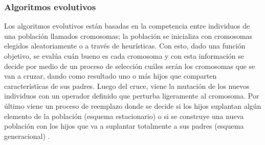 


\subsubsection{Algoritmos evolutivos}

Los algoritmos evolutivos están basadas en la competencia entre individuos de una población llamados cromosomas; la población se inicializa con cromosomas elegidos aleatoriamente o a través de heurísticas. Con esto, dado una función objetivo, se evalúa cuán bueno es cada cromosoma y con esta información se decide por medio de un proceso de selección cuáles serán los cromosomas que se van a cruzar, dando como resultado uno o más hijos que comparten características de sus padres. Luego del cruce, viene la mutación de los nuevos individuos con un operador definido que perturba ligeramente al cromosoma. Por último viene un proceso de reemplazo donde se decide si los hijos suplantan algún elemento de la población (esquema estacionario) o si se construye una nueva población con los hijos que va a suplantar totalmente a sus padres (esquema generacional) \cite{talbi2009metaheuristics}. 

